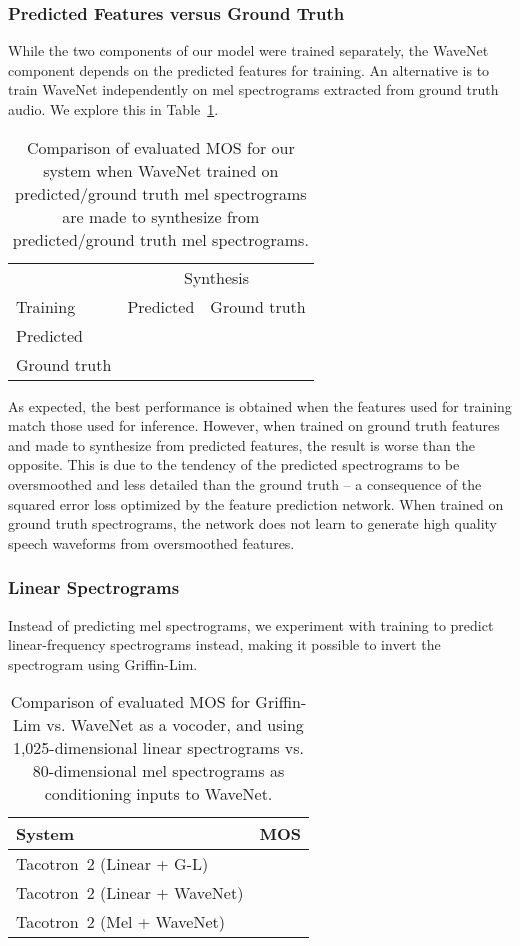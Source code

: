 \subsubsection{Predicted Features versus Ground Truth}
\label{ssec:gtfeats}

While the two components of our model were trained separately, the WaveNet component
depends on the predicted features for training. An alternative
is to train WaveNet independently on mel spectrograms extracted from ground
truth audio. We explore this in Table~\ref{tbl:pred_gt}.

\begin{table}[H]
  \centering
  \begin{tabular}{lcc}
    \toprule
                 & \multicolumn{2}{c}{Synthesis}\\
    Training     & Predicted         & Ground truth \\
    \midrule
    Predicted    &  &  \\
    Ground truth &  &  \\
    \bottomrule
  \end{tabular}
\caption{Comparison of evaluated MOS for our system when WaveNet trained on
predicted/ground truth mel spectrograms are made to synthesize from
predicted/ground truth mel spectrograms.}
\label{tbl:pred_gt}
\end{table}

As expected, the best performance is obtained when the features used for
training match those used for inference. However, when trained on
ground truth features and made to synthesize from
predicted features, the result is worse than the opposite.
This is due to the tendency of the predicted spectrograms to be oversmoothed and less
detailed than the ground truth -- a consequence of the squared error loss
optimized by the feature prediction network. When trained on ground truth
spectrograms, the network does not learn to generate high quality speech
waveforms from oversmoothed features.


\subsubsection{Linear Spectrograms}
\label{ssec:linear}

Instead of predicting mel spectrograms, we experiment with training
to predict linear-frequency spectrograms instead, making it
possible to invert the spectrogram using Griffin-Lim.

\begin{table}[H]
  \centering
  \begin{tabular}{lc}
  \toprule
  System                        & MOS \\
  \midrule
  Tacotron~2 (Linear + G-L)     &    \\
  Tacotron~2 (Linear + WaveNet) &    \\
  Tacotron~2 (Mel + WaveNet)    &  \\
  \bottomrule
  \end{tabular}
\caption{Comparison of evaluated MOS for Griffin-Lim vs. WaveNet as a vocoder,
and using 1,025-dimensional linear spectrograms vs. 80-dimensional
mel spectrograms as conditioning inputs to WaveNet.}
\end{table}

